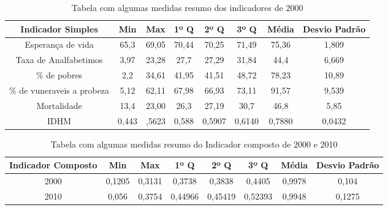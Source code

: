 \documentclass[11pt,a4paper]{article}
\begin{document}
\begin{table}[h!]
  \begin{center}
    \begin{tabular}{c|c|c|c|c|c|c|c}
    \hline
      \textbf{Indicador Simples} & \textbf{Min} & \textbf{Max} & \textbf{1º Q} & \textbf{2º Q} & \textbf{3º Q} & \textbf{Média}  & \textbf{Desvio Padrão} \\
      \hline
      Esperança de vida & 65,3 & 69,05 & 70,44 & 70,25 & 71,49 & 75,36 & 1,809 \\
      Taxa de Analfabetimos & 3,97 & 23,28 & 27,7 & 27,29 & 31,84 & 44,4 & 6,669\\
      \% de pobres & 2,2 & 34,61 & 41,95 & 41,51 & 48,72 & 78,23 & 10,89  \\ 
      \% de vuneraveis a probeza & 5,12 & 62,11 & 67,98 & 66,93 & 73,11 & 91,57 & 9,539 \\ 
      Mortalidade & 13,4 & 23,00 & 26,3 & 27,19 & 30,7 & 46,8 & 5,85\\ 
      IDHM & 0,443 & ,5623 & 0,588 & 0,5907 & 0,6140 & 0,7880 & 0,0432\\ 
      \hline
    \end{tabular}
    \caption{Tabela com algumas medidas resumo dos indicadores de 2000}
     \label{table:1}
  \end{center}
\end{table}

\begin{table}[h!]
  \begin{center}
    \begin{tabular}{c|c|c|c|c|c|c|c}
    \hline
      \textbf{Indicador Composto} & \textbf{Min} & \textbf{Max} & \textbf{1º Q} & \textbf{2º Q} & \textbf{3º Q} & \textbf{Média}  & \textbf{Desvio Padrão} \\
      \hline
	  2000 & 0,1205 & 0,3131 & 0,3738 & 0,3838 & 0,4405 & 0,9978 & 0,104\\
	  2010 & 0,056 & 0,3754 & 0,44966 & 0,45419 & 0,52393 & 0,9948 & 0,1275\\
      \hline
    \end{tabular}
    \caption{Tabela com algumas medidas resumo do Indicador composto de 2000 e 2010}
     \label{table:1}
  \end{center}
\end{table}

\renewcommand{\bibname}{Referências}





%
%
\end{document}
